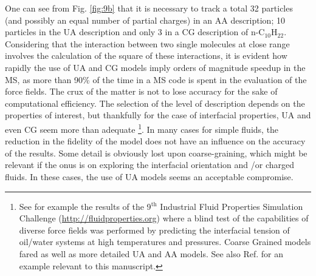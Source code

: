 \documentclass[9pt,bestpractices]{livecoms}
\begin{document}
One can see from Fig. \ref{fig:9b} that it is necessary to track a total 32 particles (and possibly
an equal number of partial charges) in an AA description; 10 particles in the
UA description and only 3 in a CG description of n-C$_{10}$H$_{22}$.
Considering that the interaction between two single molecules at close range
involves the calculation of the square of these interactions, it is evident how
rapidly the use of UA and CG models imply orders of magnitude speedup in
the MS, as more than 90\% of the time in a MS code is spent in the evaluation
of the force fields. The crux of the matter is not to lose accuracy for the
sake of computational efficiency. The selection of the level of description
depends on the properties of interest, but thankfully for the case of
interfacial properties, UA and even CG seem more than adequate
\footnote{See for example the results of the 9$^{\mathrm{th}}$
Industrial Fluid Properties Simulation Challenge
(\url{http://fluidproperties.org}) where a blind test of the capabilities of
diverse force fields was performed by predicting the interfacial tension of
oil/water systems at high temperatures and pressures. Coarse Grained models
\citep{herdes2018} fared as well as more detailed UA and AA models\citep{chen2018}.
See also Ref. \citep{avendano2011} for an example relevant to this manuscript.}.
In many cases for
simple fluids, the reduction in the fidelity of the model does not have an
influence on the accuracy of the results. 
Some detail is obviously lost upon coarse-graining,
which might be relevant if the onus is on exploring the interfacial orientation
and /or charged fluids. In these cases, the use of UA models seems an
acceptable compromise. 
\end{document}
